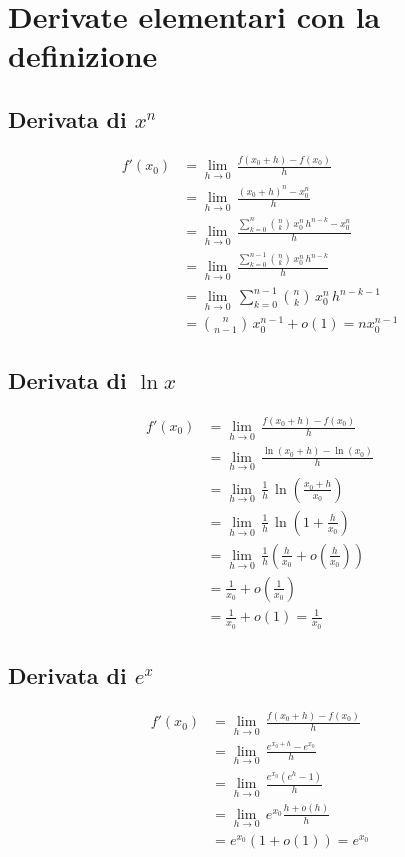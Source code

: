 \documentclass[../../analisi1]{subfiles}
\begin{document}
    \chapter{Derivate elementari con la definizione}

        \section*{Derivata di \(x^n\)}
            \begin{align*}
                f'(x_0) &= \lim_{h \to 0} \, \frac{f(x_0 + h) - f(x_0)}{h}\\
                &= \lim_{h \to 0} \, \frac{{(x_0 + h)}^n - x_0^n}{h}\\
                &= \lim_{h \to 0} \, \frac{\sum_{k = 0}^n \binom{n}{k} \, x_0^n \, h^{n - k} - x_0^n}{h}\\
                &= \lim_{h \to 0} \, \frac{\sum_{k = 0}^{n - 1} \binom{n}{k} \, x_0^n \, h^{n - k}}{h}\\
                &= \lim_{h \to 0} \, \sum_{k = 0}^{n - 1} \binom{n}{k} \, x_0^n \, h^{n - k - 1}\\
                &= \binom{n}{n - 1} \, x_0^{n - 1} + o(1) = n x_0^{n - 1}
            \end{align*}
            
        \section*{Derivata di \(\ln x\)}
            \begin{align*}
                f'(x_0) &= \lim_{h \to 0} \, \frac{f(x_0 + h) - f(x_0)}{h}\\
                &= \lim_{h \to 0} \, \frac{\ln(x_0 + h) - \ln(x_0)}{h}\\
                &= \lim_{h \to 0} \, \frac{1}{h} \, \ln \left(\frac{x_0 + h}{x_0}\right)\\
                &= \lim_{h \to 0} \, \frac{1}{h} \, \ln \left(1 + \frac{h}{x_0}\right)\\
                &= \lim_{h \to 0} \, \frac{1}{h} \left(\frac{h}{x_0} + o\!\left(\frac{h}{x_0}\right)\right)\\
                &= \frac{1}{x_0} + o\!\left(\frac{1}{x_0}\right)\\
                &= \frac{1}{x_0} + o(1) = \frac{1}{x_0}
            \end{align*}

        \section*{Derivata di \(e^x\)}
            \begin{align*}
                f'(x_0) &= \lim_{h \to 0} \, \frac{f(x_0 + h) - f(x_0)}{h}\\
                &= \lim_{h \to 0} \, \frac{e^{x_0 + h} - e^{x_0}}{h}\\
                &= \lim_{h \to 0} \, \frac{e^{x_0} (e^h - 1)}{h}\\
                &= \lim_{h \to 0} \, e^{x_0} \frac{h + o(h)}{h}\\
                &= e^{x_0} (1 + o(1)) = e^{x_0}
            \end{align*}
\end{document}
